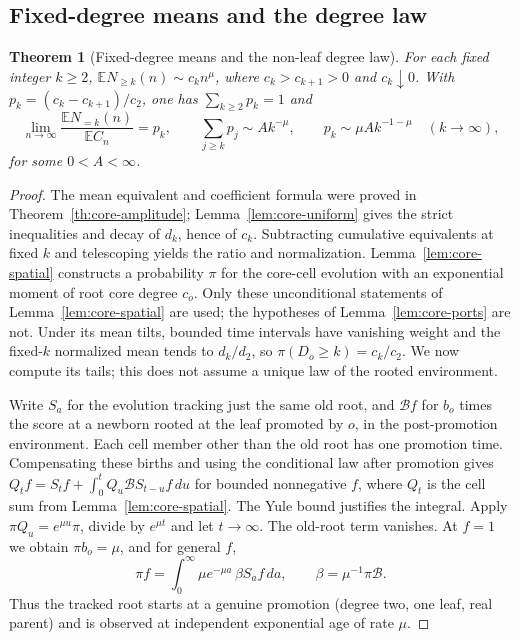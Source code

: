 \documentclass[11pt]{article}
\newtheorem{theorem}{Theorem}
\newcommand{\resulttag}{?}
\newcommand{\tagnext}[1]{\renewcommand{\resulttag}{#1}}
\theoremstyle{remark}
\numberwithin{equation}{section}
\begin{document}
\subsection{Fixed-degree means and the degree law}\label{sec:core-means}
\tagnext{DEG}
\begin{theorem}[Fixed-degree means and the non-leaf degree law]\label{th:core-means}
For each fixed integer $k\ge2$, $\mathbb E N_{\ge k}(n)\sim c_k n^\mu$, where $c_k>c_{k+1}>0$ and $c_k\downarrow0$. With $p_k=(c_k-c_{k+1})/c_2$, one has $\sum_{k\ge2}p_k=1$ and
\[
 \lim_{n\to\infty}\frac{\mathbb E N_{=k}(n)}{\mathbb E C_n}=p_k,
 \qquad \sum_{j\ge k}p_j\sim A k^{-\mu},\qquad p_k\sim\mu A k^{-1-\mu}
 \quad(k\to\infty),
\]
for some $0<A<\infty$.
\end{theorem}
\begin{proof}
The mean equivalent and coefficient formula were proved in Theorem~\ref{th:core-amplitude}; Lemma~\ref{lem:core-uniform} gives the strict inequalities and decay of $d_k$, hence of $c_k$. Subtracting cumulative equivalents at fixed $k$ and telescoping yields the ratio and normalization. Lemma~\ref{lem:core-spatial} constructs a probability $\pi$ for the core-cell evolution with an exponential moment of root core degree $c_o$. Only these unconditional statements of Lemma~\ref{lem:core-spatial} are used; the hypotheses of Lemma~\ref{lem:core-ports} are not. Under its mean tilts, bounded time intervals have vanishing weight and the fixed-$k$ normalized mean tends to $d_k/d_2$, so $\pi(D_o\ge k)=c_k/c_2$. We now compute its tails; this does not assume a unique law of the rooted environment.

Write $S_a$ for the evolution tracking just the same old root, and $\mathcal Bf$ for $b_o$ times the score at a newborn rooted at the leaf promoted by $o$, in the post-promotion environment. Each cell member other than the old root has one promotion time. Compensating these births and using the conditional law after promotion gives $Q_t f=S_t f+\int_0^t Q_u\mathcal B S_{t-u}f\,du$ for bounded nonnegative $f$, where $Q_t$ is the cell sum from Lemma~\ref{lem:core-spatial}. The Yule bound justifies the integral. Apply $\pi Q_u=e^{\mu u}\pi$, divide by $e^{\mu t}$ and let $t\to\infty$. The old-root term vanishes. At $f=1$ we obtain $\pi b_o=\mu$, and for general $f$,
\[
 \pi f=\int_0^\infty \mu e^{-\mu a}\,\beta S_a f\,da,
 \qquad \beta=\mu^{-1}\pi\mathcal B.
\]
Thus the tracked root starts at a genuine promotion (degree two, one leaf, real parent) and is observed at independent exponential age of rate $\mu$.


\end{proof}
\end{document}
